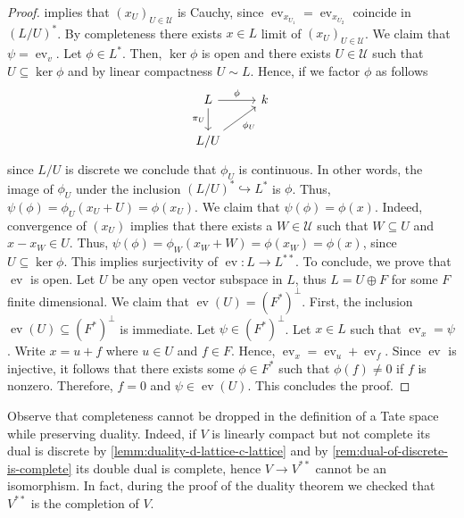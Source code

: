 \begin{proof}
	implies that $(x_{U})_{U\in\mathscr{U}}$ is Cauchy, since $\operatorname{ev}_{x_{U_{1}}} = \operatorname{ev}_{x_{U_{2}}}$ coincide in $(L/U)^{*}$. By completeness there exists $x \in L$ limit of $(x_{U})_{U\in \mathscr{U}}$. We claim that $\psi = \operatorname{ev}_{v}$. Let $\phi \in L^{*}$. Then, $\ker\phi$ is open and there exists $U\in\mathscr{U}$ such that $U \subseteq \ker\phi$ and by linear compactness $U \sim L$. Hence, if we factor $\phi$ as follows
	\[
	\begin{tikzcd}
		L \arrow[r, "\phi"] \arrow[d, swap, "\pi_{U}"] & k \\
		L/U \arrow[ur, swap, "\phi_{U}"] &
	\end{tikzcd}
	\]
	 since $L/U$ is discrete we conclude that $\phi_{U}$ is continuous. In other words, the image of $\phi_{U}$ under the inclusion $(L/U)^{*} \hookrightarrow L^{*}$ is $\phi$. Thus, $\psi(\phi) = \phi_{U}(x_{U} + U) = \phi(x_{U})$. We claim that $\psi(\phi) = \phi(x)$. Indeed, convergence of $(x_{U})$ implies that there exists a $W \in \mathscr{U}$ such that $W \subseteq U$ and $x - x_{W} \in U$. Thus, $\psi(\phi) = \phi_{W}(x_{W} + W) = \phi(x_{W}) = \phi(x)$, since $U \subseteq \ker\phi$. This implies surjectivity of $\operatorname{ev}\colon L \to L^{**}$. To conclude, we prove that $\operatorname{ev}$ is open. Let $U$ be any open vector subspace in $L$, thus $L = U \oplus F$ for some $F$ finite dimensional. We claim that $\operatorname{ev}(U) = (F^{*})^{\perp}$. First, the inclusion $\operatorname{ev}(U) \subseteq (F^{*})^{\perp}$ is immediate. Let $\psi \in (F^{*})^{\perp}$. Let $x \in L$ such that $\operatorname{ev}_{x} = \psi$. Write $x = u + f$ where $u \in U$ and $f \in F$. Hence, $\operatorname{ev}_{x} = \operatorname{ev}_{u} + \operatorname{ev}_{f}$. Since $\operatorname{ev}$ is injective, it follows that there exists some $\phi\in F^{*}$ such that $\phi(f) \neq 0$ if $f$ is nonzero. Therefore, $f = 0$ and $\psi \in \operatorname{ev}(U)$. This concludes the proof.
\end{proof}
\begin{remark}\label{rem:completeness-is-necessary-for-sel-duality}
	Observe that completeness cannot be dropped in the definition of a Tate space while preserving duality. Indeed, if $V$ is linearly compact but not complete its dual is discrete by \cref{lemm:duality-d-lattice-c-lattice} and by \cref{rem:dual-of-discrete-is-complete} its double dual is complete, hence $V \to V^{**}$ cannot be an isomorphism. In fact, during the proof of the duality theorem we checked that $V^{**}$ is the completion of $V$. 
\end{remark}
